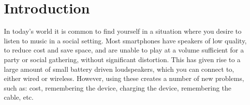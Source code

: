 \chapter{Introduction}\label{cha:introduction}
%
% 
%
%
%
%
%

In today's world it is common to find yourself in a situation where you desire to listen to music in a social setting.
Most smartphones have speakers of low quality, to reduce cost and save space, and are unable to play at a volume sufficient for a party or social gathering, without significant distortion.
This has given rise to a large amount of small battery driven loudspeakers, which you can connect to, either wired or wireless.
However, using these creates a number of new problems, such as: cost, remembering the device, charging the device, remembering the cable, etc.

